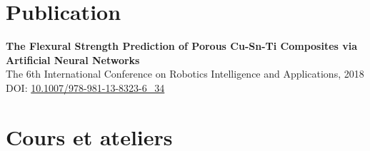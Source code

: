 \documentclass[11pt,a4paper]{article}
\begin{document}
\section*{Publication}

\textbf{\color{PrimaryColor}The Flexural Strength Prediction of Porous Cu-Sn-Ti Composites via Artificial Neural Networks}\\
The 6th International Conference on Robotics Intelligence and Applications, 2018\\
DOI:
\href{https://doi.org/10.1007/978-981-13-8323-6_34}
{10.1007/978-981-13-8323-6\_34}

\section*{Cours et ateliers}
\end{document}
